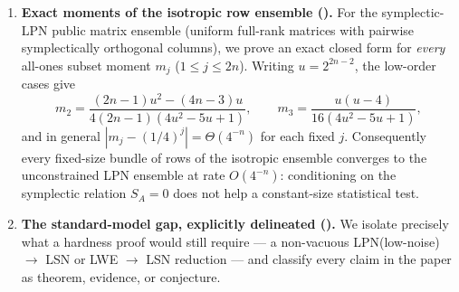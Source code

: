 \documentclass[11pt,a4paper]{article}
\theoremstyle{plain}
\theoremstyle{definition}
\begin{document}
\begin{enumerate}
    \textbf{Linear-reduction landscape.} Transport theorems ( and ) close all public-$B$ reductions; Theorem~D.1 of \cite{LPQR26} with the Fannes--Csisz\'ar inequality closes all fixed $B$; the entropy-support bound () and the reachability theorem () close conditionally-uniform adaptive $B$; and a support-counting bound () closes the deterministic marginal-adaptive case. Within the last (randomized marginal-adaptive) cell, a confined-noise support bound () closes every reduction whose conditional noise occupies sub-exponentially many low-dimensional cages, and a solvable-sample-size argument () closes near-uniform outputs --- in particular the extreme uniform-$B$ strategy --- leaving only a concentrated-diffuse residual (). The operative barrier throughout is statistical distance: the output must stay far from a \emph{usable} LPN instance. It is \emph{not} an information bound on the secret --- we correct an earlier ``$I(x;y\mid C)=o(n)$'' target, showing instead $I(x;y\mid C)=\Theta(n)$ (the leakage is symplectic-structured, unusable by an LPN solver) --- so the open core is the distance bound , not a mutual-information bound.
    
    \textbf{Two formulations.} We separate the membership and batch/sympLPN formulations and prove information-theoretic floors for the former ().

    \item \textbf{Exact moments of the isotropic row ensemble ().} For the symplectic-LPN public matrix ensemble (uniform full-rank matrices with pairwise symplectically orthogonal columns), we prove an exact closed form for \emph{every} all-ones subset moment $m_j$ ($1\le j\le 2n$). Writing $u = 2^{2n-2}$, the low-order cases give
    \[
    m_2 = \frac{(2n-1)u^2-(4n-3)u}{4(2n-1)(4u^2-5u+1)}, \qquad
    m_3 = \frac{u(u-4)}{16(4u^2-5u+1)},
    \]
    and in general $|m_j - (1/4)^j| = \Theta(4^{-n})$ for each fixed $j$. Consequently every fixed-size bundle of rows of the isotropic ensemble converges to the unconstrained LPN ensemble at rate $O(4^{-n})$: conditioning on the symplectic relation $S_A=0$ does not help a constant-size statistical test.

    \item \textbf{The standard-model gap, explicitly delineated ().} We isolate precisely what a hardness proof would still require --- a non-vacuous LPN(low-noise) $\to$ LSN or LWE $\to$ LSN reduction --- and classify every claim in the paper as theorem, evidence, or conjecture.
\end{enumerate}
\end{document}

